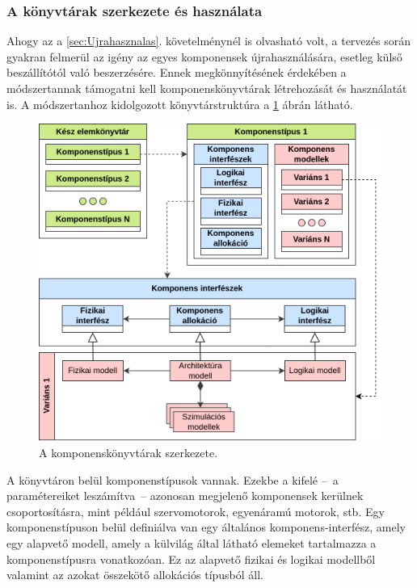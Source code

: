         \subsubsection{A könyvtárak szerkezete és használata}
        Ahogy az a \ref{sec:Ujrahasznalas}. követelménynél is olvasható volt, a tervezés során gyakran felmerül az igény az egyes komponensek újrahasználására, esetleg külső beszállítótól való beszerzésére.
        Ennek megkönnyítésének érdekében a módszertannak támogatni kell komponenskönyvtárak létrehozását és használatát is.
        A módszertanhoz kidolgozott könyvtárstruktúra a \ref{fig:Konyvtar} ábrán látható.
        \begin{figure}[!ht]
            \centering
            \includegraphics[width=150mm, keepaspectratio]{figures/InterfaceParts.drawio.png}
            \caption{A komponenskönyvtárak szerkezete.} 
            \label{fig:Konyvtar}
        \end{figure}

        A könyvtáron belül komponenstípusok vannak. Ezekbe a kifelé --~a paramétereiket leszámítva~-- azonosan megjelenő komponensek kerülnek csoportosításra, mint például szervomotorok, egyenáramú motorok, stb.
        Egy komponenstípuson belül definiálva van egy általános komponens-interfész, amely egy alapvető modell, amely a külvilág által látható elemeket tartalmazza a komponenstípusra vonatkozóan. Ez az alapvető fizikai és logikai modellből valamint az azokat összekötő allokációs típusból áll.
        
